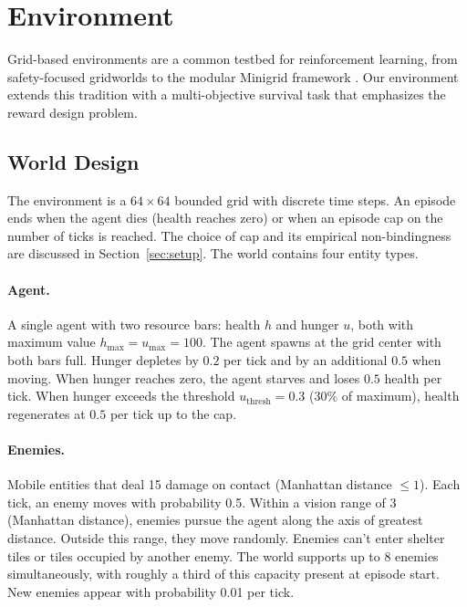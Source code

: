 \documentclass[12pt,a4paper,titlepage]{article}
\begin{document}
\section{Environment}
\label{sec:environment}

Grid-based environments are a common testbed for reinforcement learning, from safety-focused gridworlds \citep{Leike2017} to the modular Minigrid framework \citep{ChevalierBoisvert2023}. Our environment extends this tradition with a multi-objective survival task that emphasizes the reward design problem.

\subsection{World Design}
\label{sec:world_design}

The environment is a $64 \times 64$ bounded grid with discrete time steps. An episode ends when the agent dies (health reaches zero) or when an episode cap on the number of ticks is reached. The choice of cap and its empirical non-bindingness are discussed in Section~\ref{sec:setup}. The world contains four entity types.

\paragraph{Agent.} A single agent with two resource bars: health $h$ and hunger $u$, both with maximum value $h_\text{max} = u_\text{max} = 100$. The agent spawns at the grid center with both bars full. Hunger depletes by $0.2$ per tick and by an additional $0.5$ when moving. When hunger reaches zero, the agent starves and loses $0.5$ health per tick. When hunger exceeds the threshold $u_\text{thresh} = 0.3$ ($30\%$ of maximum), health regenerates at $0.5$ per tick up to the cap.

\paragraph{Enemies.} Mobile entities that deal 15 damage on contact (Manhattan distance $\leq 1$). Each tick, an enemy moves with probability 0.5. Within a vision range of 3 (Manhattan distance), enemies pursue the agent along the axis of greatest distance. Outside this range, they move randomly. Enemies can't enter shelter tiles or tiles occupied by another enemy. The world supports up to 8 enemies simultaneously, with roughly a third of this capacity present at episode start. New enemies appear with probability 0.01 per tick.
\end{document}
